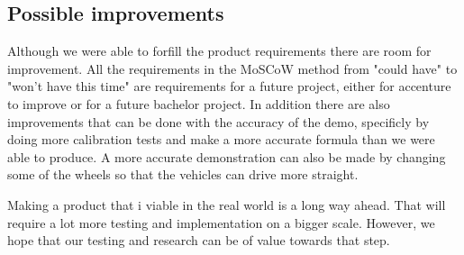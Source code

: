 \subsection{Possible improvements}

Although we were able to forfill the product requirements there are room for improvement. All the requirements in the MoSCoW method from "could have" to "won't have this time" are requirements for a future project, either for accenture to improve or for a future bachelor project. In addition there are also improvements that can be done with the accuracy of the demo, specificly by doing more calibration tests and make a more accurate formula than we were able to produce. A more accurate demonstration can also be made by changing some of the wheels so that the vehicles can drive more straight. 

Making a product that i viable in the real world is a long way ahead. That will require a lot more testing and implementation on a bigger scale. However, we hope that our testing and research can be of value towards that step.